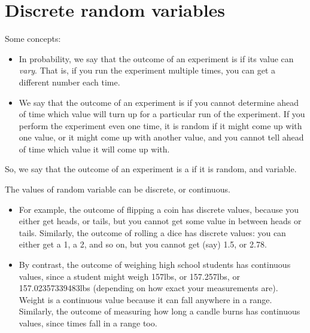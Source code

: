\documentclass[../../../main.tex]{subfiles}
\begin{document}
\chapter{Discrete random variables}


Some concepts:

\begin{itemize}

  \item In probability, we say that the outcome of an experiment is  if its value can \emph{vary}. That is, if you run the experiment multiple times, you can get a different number each time.

  \item We say that the outcome of an experiment is  if you cannot determine ahead of time which value will turn up for a particular run of the experiment. If you perform the experiment even one time, it is random if it might come up with one value, or it might come up with another value, and you cannot tell ahead of time which value it will come up with.

\end{itemize}

\noindent
So, we say that the outcome of an experiment is a  if it is random, and variable.

The values of random variable can be discrete, or continuous. 

\begin{itemize}

  \item For example, the outcome of flipping a coin has discrete values, because you either get heads, or tails, but you cannot get some value in between heads or tails. Similarly, the outcome of rolling a dice has discrete values: you can either get a 1, a 2, and so on, but you cannot get (say) 1.5, or 2.78.

  \item By contrast, the outcome of weighing high school students has continuous values, since a student might weigh 157lbs, or 157.257lbs, or 157.02357339483lbs (depending on how exact your measurements are). Weight is a continuous value because it can fall anywhere in a range. Similarly, the outcome of measuring how long a candle burns has continuous values, since times fall in a range too.

\end{itemize}
\end{document}
